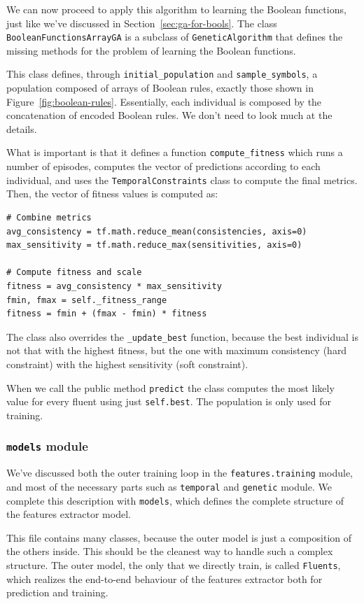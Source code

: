 We can now proceed to apply this algorithm to learning the Boolean functions,
just like we've discussed in Section~\ref{sec:ga-for-bools}.
The class \texttt{BooleanFunctionsArrayGA} is a subclass of
\texttt{GeneticAlgorithm} that defines the missing methods for the problem of
learning the Boolean functions.

This class defines, through \verb|initial_population| and
\verb|sample_symbols|, a population composed of arrays of Boolean rules,
exactly those shown in Figure~\vref{fig:boolean-rules}. Essentially, each
individual is composed by the concatenation of encoded Boolean rules. We don't
need to look much at the details.

What is important is that it defines a function \verb|compute_fitness| which
runs a number of episodes, computes the vector of predictions according to
each individual, and uses the \texttt{TemporalConstraints} class to compute
the final metrics. Then, the vector of fitness values is computed as:
\begin{lstlisting}[style=python]
# Combine metrics
avg_consistency = tf.math.reduce_mean(consistencies, axis=0)
max_sensitivity = tf.math.reduce_max(sensitivities, axis=0)

# Compute fitness and scale
fitness = avg_consistency * max_sensitivity
fmin, fmax = self._fitness_range
fitness = fmin + (fmax - fmin) * fitness
\end{lstlisting}

The class also overrides the \verb|_update_best| function, because the best
individual is not that with the highest fitness, but the one with maximum
consistency (hard constraint) with the highest sensitivity (soft constraint).

When we call the public method \texttt{predict} the class computes the most
likely value for every fluent using just \verb|self.best|. The population is
only used for training.


\subsubsection*{\texttt{models} module}

We've discussed both the outer training loop in the \verb|features.training|
module, and most of the necessary parts such as \texttt{temporal} and
\texttt{genetic} module. We complete this description with \texttt{models},
which defines the complete structure of the features extractor model.

This file contains many classes, because the outer model is just a composition
of the others inside. This should be the cleanest way to handle such a complex
structure. The outer model, the only that we directly train, is called
\texttt{Fluents}, which realizes the end-to-end behaviour of the features
extractor both for prediction and training.

